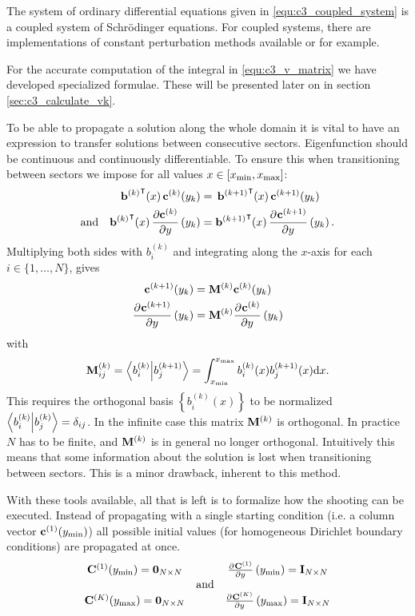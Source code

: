 The system of ordinary differential equations given in \eqref{equ:c3_coupled_system} is a coupled system of Schrö\-dinger equations. For coupled systems, there are implementations of constant perturbation methods available \lilix{}\cite{ixaru_lilix_2002} or \matscs{}\cite{ledoux_numerical_2007} for example.

For the accurate computation of the integral in \eqref{equ:c3_v_matrix} we have developed specialized formulae. These will be presented later on in section \ref{sec:c3_calculate_vk}.

To be able to propagate a solution along the whole domain it is vital to have an expression to transfer solutions between consecutive sectors. Eigenfunction should be continuous and continuously differentiable. To ensure this when transitioning between sectors we impose for all values $x \in [{x_{\text{min}}}, {x_{\text{max}}}]$:
\begin{align*}
    {\vb{b}^{(k)}}^\intercal(x) \, \vb{c}^{(k)}(y_k)                   & =\, {\vb{b}^{(k+1)}}^\intercal(x) \, \vb{c}^{(k+1)}(y_k)                   \\
    \text{and}\quad
    {\vb{b}^{(k)}}^\intercal(x)\,\pdv{\vb{c}^{(k)}}{y}\left(y_k\right) & = {\vb{b}^{(k+1)}}^\intercal(x)\,\pdv[]{\vb{c}^{(k+1)}}{y}\left(y_k\right) \text{.}
\end{align*}
Multiplying both sides with $b_i^{(k)}$ and integrating along the $x$-axis for each $i \in \{1, \dots, N\}$, gives
\begin{align*}
    \vb{c}^{(k+1)}(y_k)                       & = \vb{M}^{(k)} \vb{c}^{(k)}(y_k)                       \\
    \pdv[]{\vb{c}^{(k+1)}}{y}\left(y_k\right) & = \vb{M}^{(k)} \pdv[]{\vb{c}^{(k)}}{y}\left(y_k\right)
\end{align*}
with
$$
    \vb{M}^{(k)}_{ij} = \bra{b_{i}^{(k)}}\ket{b_{j}^{(k+1)}} = \int_{x_{\text{min}}}^{x_{\text{max}}} b_i^{(k)}(x) b_j^{(k+1)}(x) \dd x \text{.}
$$
This requires the orthogonal basis $\left\{b_i^{(k)}(x)\right\}$ to be normalized $\bra{b_{i}^{(k)}}\ket{b_{j}^{(k)}} = \delta_{ij}$. In the infinite case this matrix $\vb{M}^{(k)}$ is orthogonal. In practice $N$ has to be finite, and $\vb{M}^{(k)}$ is in general no longer orthogonal. Intuitively this means that some information about the solution is lost when transitioning between sectors. This is a minor drawback, inherent to this method.

With these tools available, all that is left is to formalize how the shooting can be executed. Instead of propagating with a single starting condition (i.e. a column vector $\vb{c}^{(1)}({y_{\text{min}}})$) all possible initial values (for homogeneous Dirichlet boundary conditions) are propagated at once.
$$
    \begin{matrix}
        \vb{C}^{(1)}({y_{\text{min}}}) = \vb{0}_{N\times N} &            & \pdv[]{\vb{C}^{(1)}}{y}\left({y_{\text{min}}}\right) = \vb{I}_{N\times N} \\
                                                 & \text{and} &                                                                \\
        \vb{C}^{(K)}({y_{\text{max}}}) = \vb{0}_{N\times N} &            & \pdv[]{\vb{C}^{(K)}}{y}\left({y_{\text{max}}}\right) = \vb{I}_{N\times N}
    \end{matrix}
$$


